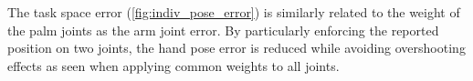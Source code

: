
The task space error (\cref{fig:indiv_pose_error}) is similarly related to the weight of the palm joints as the arm joint error. By particularly enforcing the reported position on two joints, the hand pose error is reduced while avoiding overshooting effects as seen when applying common weights to all joints.

